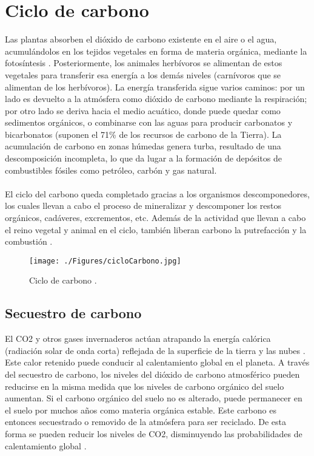 \section{Ciclo de carbono} 
Las plantas absorben el dióxido de carbono existente en el aire o el agua, acumul\'andolos en los tejidos vegetales en forma de materia org\'anica, mediante la fotos\'intesis \cite{natur2015PW}. Posteriormente, los animales herb\'ivoros se alimentan de estos vegetales para transferir esa energ\'ia a los dem\'as niveles (carnívoros que se alimentan de los herb\'ivoros).
La energía transferida sigue varios caminos: por un lado es devuelto a la atm\'osfera como di\'oxido de carbono mediante la respiraci\'on; por otro lado se deriva hacia el medio acu\'atico, donde puede quedar como sedimentos org\'anicos, o combinarse con las aguas para producir carbonatos y bicarbonatos (suponen el 71\% de los recursos de carbono de la Tierra). La acumulaci\'on de carbono en zonas h\'umedas genera turba, resultado de una descomposición incompleta, lo que da lugar a la formaci\'on de dep\'ositos de combustibles f\'osiles como petr\'oleo, carb\'on y gas natural.\\~\\
El ciclo del carbono queda completado gracias a los organismos des\-componedores, los cuales llevan a cabo el proceso de mineralizar y descomponer los restos org\'anicos, cad\'averes, excrementos, etc. Adem\'as de la actividad que llevan a cabo el reino vegetal y animal en el ciclo, tambi\'en liberan carbono la putrefacci\'on y la combusti\'on \cite{natur2015PW}.
    \begin{figure}[!hbtp]
    	\centering
    	\texttt{[image: ./Figures/cicloCarbono.jpg]}
    	\caption{Ciclo de carbono \cite{ciclot2015carbo}.}
    	\label{fig:ciclocarbono}
    \end{figure}


\subsection{Secuestro de carbono}
El CO2 y otros gases invernaderos actúan atrapando la energ\'ia cal\'orica (radiación solar de onda corta) reflejada de la superficie de la tierra y las nubes \cite{encaptura}. Este calor retenido puede conducir al calentamiento global en el planeta. A trav\'es del secuestro de carbono, los niveles del di\'oxido de carbono atmosf\'erico pueden reducirse en la misma medida que los niveles de carbono org\'anico del suelo aumentan. Si el carbono org\'anico del suelo no es alterado, puede permanecer en el suelo por muchos a\~{n}os como materia org\'anica estable. Este carbono es entonces secuestrado o removido de la atm\'osfera para ser reciclado. De esta forma se pueden reducir los niveles de CO2, disminuyendo las probabilidades de calentamiento global \cite{castillo2003manejo}.
